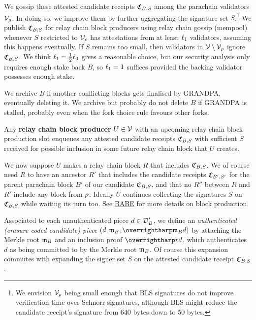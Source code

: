 We gossip these attested candidate receipts $\mathfrak{C}_{B,S}$ among the parachain validators $\mathcal{V}_{\rho}$.  
%
In doing so, we improve them by further aggregating the signature set $S$.\footnote{We envision $\mathcal{V}_{\rho}$ being small enough that BLS signatures do not improve verification time over Schnorr signatures, although BLS might reduce the candidate receipt's signature from 640 bytes down to 50 bytes.}  We publish $\mathfrak{C}_{B,S}$ for relay chain block producers using relay chain gossip (mempool) whenever $S$ restricted to $\mathcal{V}_\rho$ has attestations from at least $\ell_1$ validators, assuming this happens eventually.  If $S$ remains too small, then validators in $\mathcal{V} \setminus \mathcal{V}_\rho$ ignore $\mathfrak{C}_{B,S}$.
We think $\ell_1 = {1\over2} \ell_0$ gives a reasonable choice, but our security analysis only requires enough stake back $B$, so $\ell_1 = 1$ suffices provided the backing validator possesses enough stake.

We archive $B$ if another conflicting blocks gets finalised by GRANDPA, eventually deleting it.  We archive but probably do not delete $B$ if GRANDPA is stalled, probably even when the fork choice rule favours other forks.  


Any {\bf relay chain block producer} $U \in \mathcal{V}$ with an upcoming relay chain block production slot enqueues any attested candidate receipts $\mathfrak{C}_{B,S}$ with sufficient $S$ received for possible inclusion in some future relay chain block that $U$ creates.  

We now suppose $U$ makes a relay chain block $R$ that includes $\mathfrak{C}_{B,S}$.  We of course need $R$ to have an ancestor $R'$ that includes the candidate receipts $\mathfrak{C}_{B',S'}$ for the parent parachain block $B'$ of our candidate $\mathfrak{C}_{B,S}$, and that no $R''$ between $R$ and $R'$ include any block from $\rho$.  Ideally $U$ continues collecting the signatures $S$ on $\mathfrak{C}_{B,S}$ while waiting its turn too.  See \href{http://research.web3.foundation/en/latest/polkadot/BABE/Babe/}{BABE} for more details on block production.

Associated to each unauthenticated piece $d \in \mathcal{D}'_B$, we define an {\em authenticated (erasure coded candidate) piece} $(d,\merkleroot_B,\vect{\merkleroot_B d})$ by attaching the Merkle root $\mathfrak{m}_B$ and an inclusion proof $\vect{rd}$, which authenticates $d$ as being committed to by the Merkle root $\mathfrak{m}_B$.  Of course this expansion commutes with expanding the signer set $S$ on the attested candidate receipt $\mathfrak{C}_{B,S}$.

